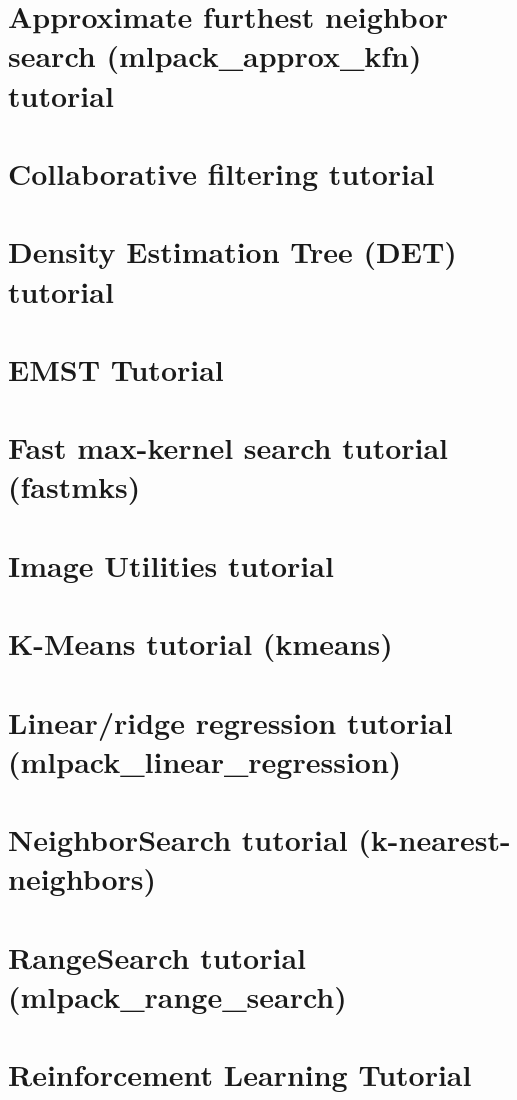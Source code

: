 \let\mypdfximage\pdfximage\def\pdfximage{\immediate\mypdfximage}\documentclass[twoside]{book}
\newcommand{\+}{\discretionary{\mbox{\scriptsize$\hookleftarrow$}}{}{}}
\begin{document}
\chapter{Approximate furthest neighbor search (mlpack\+\_\+approx\+\_\+kfn) tutorial}
\label{akfntutorial}

\chapter{Collaborative filtering tutorial}
\label{cftutorial}

\chapter{Density Estimation Tree (DET) tutorial}
\label{dettutorial}

\chapter{EMST Tutorial}
\label{emst_tutorial}

\chapter{Fast max-\/kernel search tutorial (fastmks)}
\label{fmkstutorial}

\chapter{Image Utilities tutorial}
\label{imagetutorial}

\chapter{K-\/\+Means tutorial (kmeans)}
\label{kmtutorial}

\chapter{Linear/ridge regression tutorial (mlpack\+\_\+linear\+\_\+regression)}
\label{lrtutorial}

\chapter{Neighbor\+Search tutorial (k-\/nearest-\/neighbors)}
\label{nstutorial}

\chapter{Range\+Search tutorial (mlpack\+\_\+range\+\_\+search)}
\label{rstutorial}

\chapter{Reinforcement Learning Tutorial}
\label{rltutorial}

\end{document}
